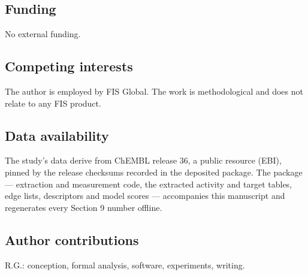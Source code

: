 \documentclass[11pt]{article}
\begin{document}
\subsection*{Funding}

No external funding.

\subsection*{Competing interests}

The author is employed by FIS Global. The work is methodological and does
not relate to any FIS product.

\subsection*{Data availability}

The study's data derive from ChEMBL release 36, a public resource
(EBI), pinned by the release checksums recorded in the deposited
package. The package --- extraction and measurement code, the
extracted activity and target tables, edge lists, descriptors and
model scores --- accompanies this manuscript and regenerates every
Section 9 number offline.

\subsection*{Author contributions}

R.G.: conception, formal analysis, software, experiments, writing.
\end{document}
